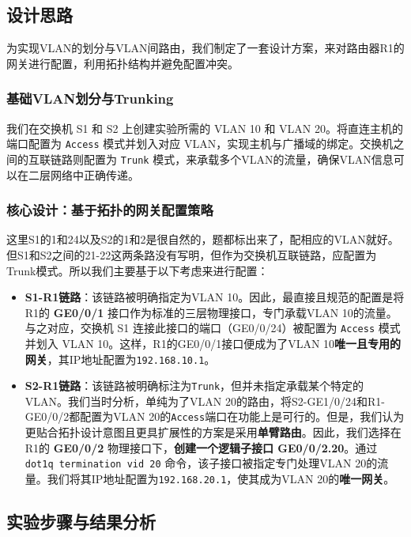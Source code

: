 \documentclass[12pt, a4paper]{article}
\begin{document}
\subsection{设计思路}

为实现VLAN的划分与VLAN间路由，我们制定了一套设计方案，来对路由器R1的网关进行配置，利用拓扑结构并避免配置冲突。

\subsubsection{基础VLAN划分与Trunking}
我们在交换机 S1 和 S2 上创建实验所需的 VLAN 10 和 VLAN 20。将直连主机的端口配置为 \texttt{Access} 模式并划入对应 VLAN，实现主机与广播域的绑定。交换机之间的互联链路则配置为 \texttt{Trunk} 模式，来承载多个VLAN的流量，确保VLAN信息可以在二层网络中正确传递。

\subsubsection{核心设计：基于拓扑的网关配置策略}
这里S1的1和24以及S2的1和2是很自然的，题都标出来了，配相应的VLAN就好。但S1和S2之间的21-22这两条路没有写明，但作为交换机互联链路，应配置为Trunk模式。所以我们主要基于以下考虑来进行配置：

\begin{itemize}
    \item \textbf{S1-R1链路}：该链路被明确指定为VLAN 10。因此，最直接且规范的配置是将R1的 \textbf{GE0/0/1} 接口作为标准的三层物理接口，专门承载VLAN 10的流量。与之对应，交换机 S1 连接此接口的端口（GE0/0/24）被配置为 \texttt{Access} 模式并划入 VLAN 10。这样，R1的GE0/0/1接口便成为了VLAN 10\textbf{唯一且专用的网关}，其IP地址配置为\texttt{192.168.10.1}。
    
    \item \textbf{S2-R1链路}：该链路被明确标注为\texttt{Trunk}，但并未指定承载某个特定的VLAN。我们当时分析，单纯为了VLAN 20的路由，将S2-GE1/0/24和R1-GE0/0/2都配置为VLAN 20的\texttt{Access}端口在功能上是可行的。但是，我们认为更贴合拓扑设计意图且更具扩展性的方案是采用\textbf{单臂路由}。因此，我们选择在R1的 \textbf{GE0/0/2} 物理接口下，\textbf{创建一个逻辑子接口 GE0/0/2.20}。通过 \texttt{dot1q termination vid 20} 命令，该子接口被指定专门处理VLAN 20的流量。我们将其IP地址配置为\texttt{192.168.20.1}，使其成为VLAN 20的\textbf{唯一网关}。
\end{itemize}

\subsection{实验步骤与结果分析}
\end{document}
